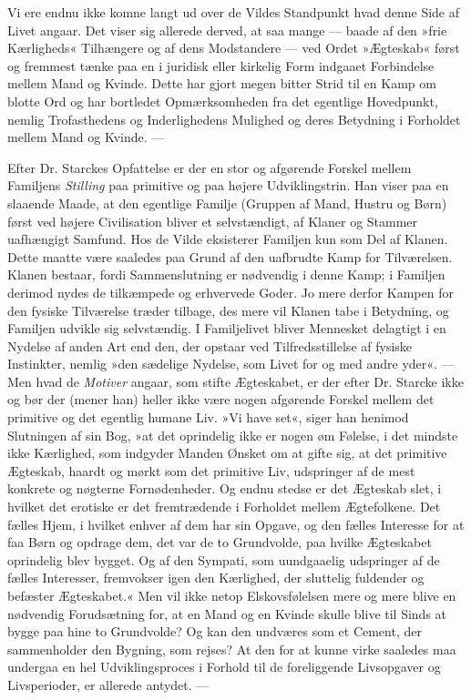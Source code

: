 \documentclass[12pt,a4paper,openany]{book}
\newcommand{\opage}[1]{\marginnote{\footnotesize\textit{[#1]}}}
\begin{document}
Vi ere endnu ikke komne langt ud over de Vildes Standpunkt
hvad denne Side af Livet angaar. Det viser sig allerede
derved, at saa mange — baade af den »frie Kærligheds« Tilhængere
og af dens Modstandere — ved Ordet »Ægteskab« først og
fremmest tænke paa en i juridisk eller kirkelig Form indgaaet
Forbindelse mellem Mand og Kvinde. Dette har gjort megen bitter
Strid til en Kamp om blotte Ord og har bortledet Opmærksomheden
fra det egentlige Hovedpunkt, nemlig Trofasthedens og
Inderlighedens Mulighed og deres Betydning i Forholdet mellem
Mand og Kvinde. —

Efter Dr. Starckes Opfattelse er der en stor og afgørende
Forskel mellem Familjens \emph{Stilling} paa primitive og paa højere
Udviklingstrin. Han viser paa en slaaende Maade, at den egentlige
Familje (Gruppen af Mand, Hustru og Børn) først ved højere
Civilisation bliver et selvstændigt, af Klaner og Stammer uafhængigt
Samfund. Hos de Vilde eksisterer Familjen kun som Del
af Klanen. Dette maatte være saaledes paa Grund af den uafbrudte
Kamp for Tilværelsen. Klanen bestaar, fordi Sammenslutning
er nødvendig i denne Kamp; i Familjen derimod nydes
de tilkæmpede og erhvervede Goder. Jo mere derfor Kampen for
den fysiske Tilværelse træder tilbage, des mere vil Klanen tabe i
Betydning, og Familjen udvikle sig selvstændig. I Familjelivet
bliver Mennesket delagtigt i en Nydelse af anden Art end den, der
opstaar ved Tilfredsstillelse af fysiske Instinkter, nemlig »den
sædelige Nydelse, som Livet for og med andre yder«. — Men
hvad de \emph{Motiver} angaar, som stifte Ægteskabet, er der efter Dr.
Starcke ikke og bør der (mener han) heller ikke være nogen afgørende
Forskel mellem det primitive og det egentlig humane Liv. »Vi
have set«, siger han henimod Slutningen af sin Bog, »at det oprindelig
ikke er nogen øm Følelse, i det mindste ikke Kærlighed,
som indgyder Manden Ønsket om at gifte sig, at det primitive
\opage{795}Ægteskab, haardt og mørkt som det primitive Liv, udspringer af
de mest konkrete og nøgterne Fornødenheder. Og endnu stedse
er det Ægteskab slet, i hvilket det erotiske er det fremtrædende
i Forholdet mellem Ægtefolkene. Det fælles Hjem, i hvilket
enhver af dem har sin Opgave, og den fælles Interesse for at faa
Børn og opdrage dem, det var de to Grundvolde, paa hvilke
Ægteskabet oprindelig blev bygget. Og af den Sympati, som
uundgaaelig udspringer af de fælles Interesser, fremvokser igen den
Kærlighed, der sluttelig fuldender og befæster Ægteskabet.« Men
vil ikke netop Elskovsfølelsen mere og mere blive en nødvendig
Forudsætning for, at en Mand og en Kvinde skulle blive til Sinds
at bygge paa hine to Grundvolde? Og kan den undværes som
et Cement, der sammenholder den Bygning, som rejses? At den
for at kunne virke saaledes maa undergaa en hel Udviklingsproces
i Forhold til de foreliggende Livsopgaver og Livsperioder, er allerede
antydet. —
\end{document}
